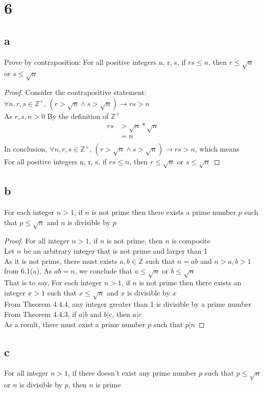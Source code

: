 \documentclass{article}
\begin{document}
\section{6}
\subsection{a}
Prove by contraposition: For all positive integers n, r, s, if $rs \leq n$, then $r \leq \sqrt{n}$ or $ s \leq \sqrt{n}$\\

\begin{proof}
Consider the contrapositive statement:\\
$\forall n,r,s \in \mathbb{Z^+}$, $(r > \sqrt{n} \wedge s > \sqrt{n}) \rightarrow rs > n$\\
As $r,s,n > 0$ By the definition of $\mathbb{Z^+}$
\begin{align*}
    rs &> \sqrt{n} * \sqrt{n}\tag{By substitution}\\
    &= n \tag{By algebra}\\
\end{align*}
In conclusion, $\forall n,r,s \in \mathbb{Z^+}$, $(r > \sqrt{n} \wedge s > \sqrt{n}) \rightarrow rs > n$, which means \\
For all positive integers n, r, s, if $rs \leq n$, then $r \leq \sqrt{n}$ or $ s \leq \sqrt{n}$
\end{proof}

\subsection{b}
For each integer $n>1$, if $n$ is not prime then there exists a prime number $p$ such that $p \leq \sqrt{n}$ and $n$ is divisible by $p$

\begin{proof}
For all integer $n > 1$, if $ n$ is not prime, then $n$ is composite\\
Let $n$ be an arbitrary integer that is not prime and larger than 1\\
As it is not prime, there must exists $a,b \in \mathbb{Z}$ such that $n = ab$ and $n > a,b > 1$\\
from 6.1(a), As $ab = n$, we conclude that $a \leq \sqrt{n}$ or $b \leq \sqrt{n}$\\
That is to say, For each integer $n>1$, if $n$ is not prime then there exists an integer $x > 1$ such that $x \leq \sqrt{n}$ and $x$ is divisible by $x$\\
From Theorem 4.4.4, any integer greater than 1 is divisible by a prime number\\
From Theorem 4.4.3, if $a | b$ and $b|c$, then $a|c$\\
As a result, there must exist a prime number $p$ such that $p|n$
\end{proof}

\subsection{c}
For all integer $n>1$, if there doesn't exist any prime number $p$ such that $p \leq \sqrt{n}$ or $n$ is divisible by $p$, then $n$ is prime
 
 
\end{document}
